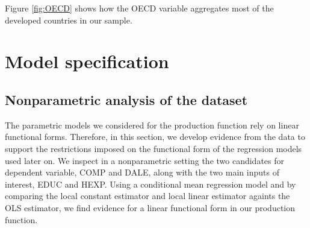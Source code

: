 \documentclass[12pt,a4paper]{article}\usepackage[]{graphicx}\usepackage[]{color}
\begin{document}

Figure \ref{fig:OECD} shows how the OECD variable aggregates most of the developed countries in our sample.






%
%

\section{Model specification}
\subsection{Nonparametric analysis of the dataset}
The parametric models we considered for the production function rely on linear functional forms. Therefore, in this section, we develop evidence from the data to support the restrictions imposed on the functional form of the regression models used later on. We inspect in a nonparametric setting the two candidates for dependent variable, COMP and DALE, along with the two main inputs of interest, EDUC and HEXP. Using a conditional mean regression model and by comparing the local constant estimator and local linear estimator againts the OLS estimator, we find evidence for a linear functional form in our production function. 
 
\end{document}
